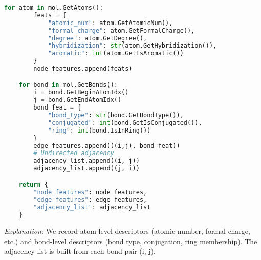\documentclass[fontsize=11pt]{article}
\begin{document}
\begin{itemize}
\begin{lstlisting}[language=Python]
    for atom in mol.GetAtoms():
        feats = {
            "atomic_num": atom.GetAtomicNum(),
            "formal_charge": atom.GetFormalCharge(),
            "degree": atom.GetDegree(),
            "hybridization": str(atom.GetHybridization()),
            "aromatic": int(atom.GetIsAromatic())
        }
        node_features.append(feats)

    for bond in mol.GetBonds():
        i = bond.GetBeginAtomIdx()
        j = bond.GetEndAtomIdx()
        bond_feat = {
            "bond_type": str(bond.GetBondType()),
            "conjugated": int(bond.GetIsConjugated()),
            "ring": int(bond.IsInRing())
        }
        edge_features.append(((i,j), bond_feat))
        # Undirected adjacency
        adjacency_list.append((i, j))
        adjacency_list.append((j, i))

    return {
        "node_features": node_features,
        "edge_features": edge_features,
        "adjacency_list": adjacency_list
    }
\end{lstlisting}

\noindent
\emph{Explanation:} We record atom-level descriptors (atomic number, formal charge, etc.) and 
bond-level descriptors (bond type, conjugation, ring membership). The adjacency list is built
from each bond pair (i, j). 




\end{itemize}
\end{document}
